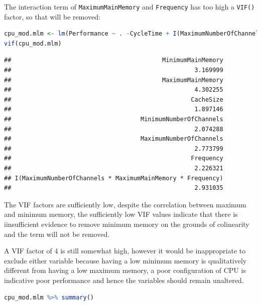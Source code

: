 \documentclass[
]{article}
\newcommand{\passthrough}[1]{#1}
\begin{document}
The interaction term of \passthrough{\lstinline!MaximumMainMemory!} and
\passthrough{\lstinline!Frequency!} has too high a
\passthrough{\lstinline!VIF()!} factor, so that will be removed:

\begin{lstlisting}[language=R]
cpu_mod.mlm <- lm(Performance ~ . -CycleTime + I(MaximumNumberOfChannels * MaximumMainMemory * Frequency)  , data = cpu) 
vif(cpu_mod.mlm)
\end{lstlisting}

\begin{lstlisting}
##                                          MinimumMainMemory 
##                                                   3.169999 
##                                          MaximumMainMemory 
##                                                   4.302255 
##                                                  CacheSize 
##                                                   1.897146 
##                                    MinimumNumberOfChannels 
##                                                   2.074288 
##                                    MaximumNumberOfChannels 
##                                                   2.773799 
##                                                  Frequency 
##                                                   2.226321 
## I(MaximumNumberOfChannels * MaximumMainMemory * Frequency) 
##                                                   2.931035
\end{lstlisting}


The VIF factors are sufficiently low, despite the correlation between
maximum and minimum memory, the sufficiently low VIF values indicate
that there is iinsufficient evidence to remove minimum memory on the
grounds of colinearity and the term will not be removed.

A VIF factor of 4 is still somewhat high, however it would be
inappropriate to exclude either variable because having a low minimum
memory is qualitatively different from having a low maximum memory, a
poor configuration of CPU is indicative poor performance and hence the
variables should remain unaltered.

\begin{lstlisting}[language=R]
cpu_mod.mlm %>% summary()
\end{lstlisting}
\end{document}
